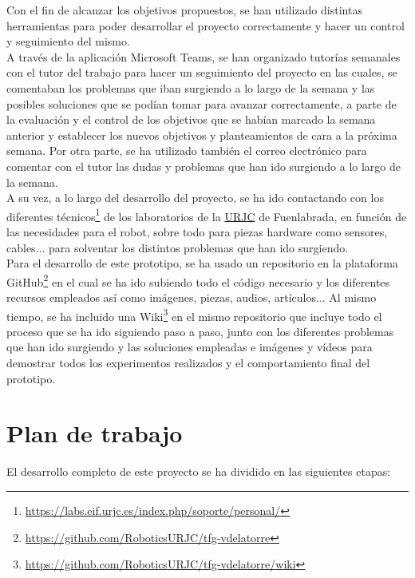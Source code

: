 Con el fin de alcanzar los objetivos propuestos, se han utilizado distintas herramientas para poder desarrollar el proyecto correctamente y
hacer un control y seguimiento del mismo.\\

A través de la aplicación Microsoft Teams, se han organizado tutorías semanales con el tutor del trabajo para hacer un seguimiento del proyecto en las cuales, se comentaban los problemas que iban surgiendo a lo largo de la semana y las posibles soluciones que se podían tomar para avanzar correctamente, a parte de la evaluación y el control de los objetivos que se habían marcado la semana anterior y establecer los nuevos objetivos y planteamientos de cara a la próxima semana. Por otra parte, se ha utilizado también el correo electrónico para comentar con el tutor las dudas y problemas que han ido surgiendo a lo largo de la semana.\\ 


A su vez, a lo largo del desarrollo del proyecto, se ha ido contactando con los diferentes técnicos\footnote{\url{https://labs.eif.urjc.es/index.php/soporte/personal/}} de los laboratorios de la \hyperlink{URJC}{URJC} de Fuenlabrada, en función de las necesidades para el robot, sobre todo para piezas hardware como sensores, cables... para solventar los distintos problemas que han ido surgiendo.\\ 

Para el desarrollo de este prototipo, se ha usado un repositorio en la plataforma GitHub\footnote{\url{https://github.com/RoboticsURJC/tfg-vdelatorre}} en el cual se ha ido subiendo todo el código necesario y los diferentes recursos empleados así como imágenes, piezas, audios, artículos... Al mismo tiempo, se ha incluido una Wiki\footnote{\url{https://github.com/RoboticsURJC/tfg-vdelatorre/wiki}} en el mismo repositorio que incluye todo el proceso que se ha ido siguiendo paso a paso, junto con los diferentes problemas que han ido surgiendo y las soluciones empleadas e imágenes y vídeos para demostrar todos los experimentos realizados y el comportamiento final del prototipo.




\section{Plan de trabajo}
\label{sec:plantrabajo}

El desarrollo completo de este proyecto se ha dividido en las siguientes etapas:


